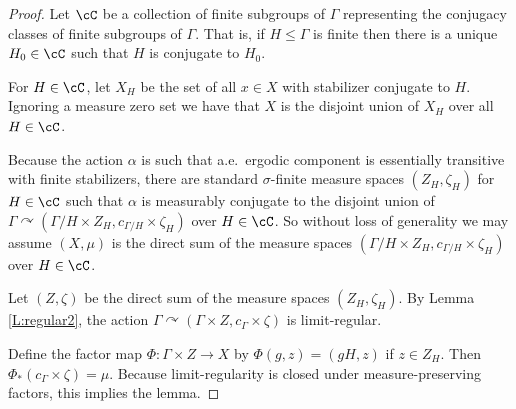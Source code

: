 \documentclass[12pt]{article}
\theoremstyle{plain}
\newtheorem{cor}[thm]{Corollary}
\theoremstyle{definition}
\theoremstyle{remark}
\newcommand{\G}{\Gamma}
\renewcommand\a{\alpha}
\newcommand\s{\sigma}
\def\cc{{\curvearrowright}}
\begin{document}
\begin{proof}
Let $\cC$ be a collection of finite subgroups of $\G$ representing the conjugacy classes of finite subgroups of $\G$. That is, if $H \le \G$ is finite then there is a unique $H_0 \in \cC$ such that $H$ is conjugate to $H_0$.

For $H\in \cC$, let $X_H$ be the set of all $x\in X$ with stabilizer conjugate to $H$. Ignoring a measure zero set we have that $X$ is the disjoint union of $X_H$ over all $H\in \cC$. 

Because the action $\a$ is such that a.e.\ ergodic component is essentially transitive with finite stabilizers, there are standard $\s$-finite measure spaces $(Z_H,\zeta_H)$  for $H\in \cC$ such that $\a$ is measurably conjugate to the disjoint union of $\G \cc (\G/H\times  Z_H, c_{\G/H} \times \zeta_H)$ over $H\in \cC$. So without loss of generality we may assume $(X,\mu)$ is the direct sum of the measure spaces  $(\G/H \times Z_H,c_{\G/H}\times \zeta_H)$ over $H \in \cC$.

Let $(Z,\zeta)$ be the direct sum of the measure spaces $(Z_H,\zeta_H)$. By Lemma \ref{L:regular2}, the action $\G \cc (\G\times Z,c_\G\times \zeta)$ is limit-regular. 

Define the factor map $\Phi:\G \times Z \to X$ by $\Phi(g,z)=(gH,z)$ if $z\in Z_H$. Then $\Phi_*(c_\G\times \zeta)=\mu$. Because limit-regularity is closed under measure-preserving factors, this implies the lemma.
\end{proof}


\end{document}
